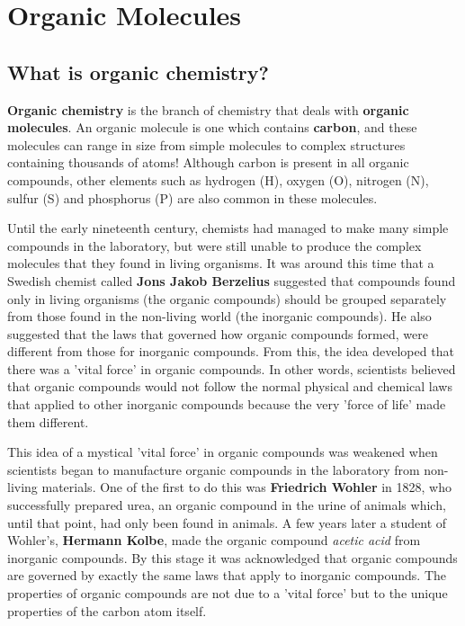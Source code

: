 \chapter{Organic Molecules}
\label{chap:om}




\section{What is organic chemistry?}
\label{sec:om:hist}

\textbf{Organic chemistry} is the branch of chemistry that deals with \textbf{organic molecules}. An organic molecule is one which contains \textbf{carbon}, and these molecules can range in size from simple molecules to complex structures containing thousands of atoms! Although carbon is present in all organic compounds, other elements such as hydrogen (H), oxygen (O), nitrogen (N), sulfur (S) and phosphorus (P) are also common in these molecules.

Until the early nineteenth century, chemists had managed to make many simple compounds in the laboratory, but were still unable to produce the complex molecules that they found in living organisms. It was around this time that a Swedish chemist called \textbf{Jons Jakob Berzelius} suggested that compounds found only in living organisms (the organic compounds) should be grouped separately from those found in the non-living world (the inorganic compounds). He also suggested that the laws that governed how organic compounds formed, were different from those for inorganic compounds. From this, the idea developed that there was a 'vital force' in organic compounds. In other words, scientists believed that organic compounds would not follow the normal physical and chemical laws that applied to other inorganic compounds because the very 'force of life' made them different.

This idea of a mystical 'vital force' in organic compounds was weakened when scientists began to manufacture organic compounds in the laboratory from non-living materials. One of the first to do this was \textbf{Friedrich Wohler} in 1828, who successfully prepared urea, an organic compound in the urine of animals which, until that point, had only been found in animals. A few years later a student of Wohler's, \textbf{Hermann Kolbe}, made the organic compound \textit{acetic acid} from inorganic compounds. By this stage it was acknowledged that organic compounds are governed by exactly the same laws that apply to inorganic compounds. The properties of organic compounds are not due to a 'vital force' but to the unique properties of the carbon atom itself.\\

